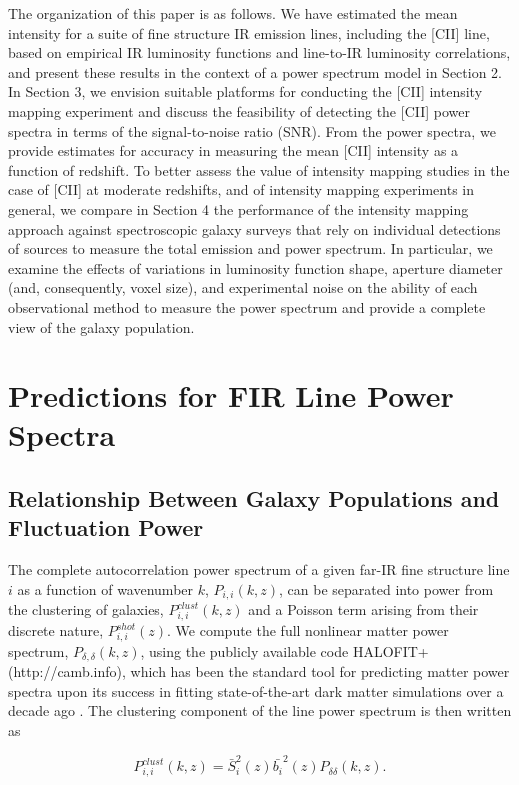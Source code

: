 \documentclass[iop,twocolappendix]{emulateapj}
\begin{document}
The organization of this paper is as follows. We have estimated the mean intensity for a suite of fine structure IR emission lines, including the [CII] line, based on empirical IR luminosity functions and line-to-IR luminosity correlations, and present these results in the context of a power spectrum model in Section 2. In Section 3, we envision suitable platforms for conducting the [CII] intensity mapping experiment and discuss the feasibility of detecting the [CII] power spectra in terms of the signal-to-noise ratio (SNR). From the power spectra, we provide estimates for accuracy in measuring the mean [CII] intensity as a function of redshift. To better assess the value of intensity mapping studies in the case of [CII] at moderate redshifts, and of intensity mapping experiments in general, we compare in Section 4 the performance of the intensity mapping approach against spectroscopic galaxy surveys that rely on individual detections of sources to measure the total emission and power spectrum. In particular, we examine the effects of variations in luminosity function shape, aperture diameter (and, consequently, voxel size), and experimental noise on the ability of each observational method to measure the power spectrum and provide a complete view of the galaxy population. 

\section{Predictions for FIR Line Power Spectra}

\subsection{Relationship Between Galaxy Populations and Fluctuation Power}

The complete autocorrelation power spectrum of a given far-IR fine structure line $i$ as a function of wavenumber $k$, $P_{i,i}(k,z)$, can be separated into power from the clustering of galaxies, $P_{i,i}^{clust}(k,z)$ and a Poisson term arising from their discrete nature, $P_{i,i}^{shot}(z)$. We compute the full nonlinear matter power spectrum, $P_{\delta,\delta}(k, z)$, using the publicly available code HALOFIT+ (http://camb.info), which has been the standard tool for predicting matter power spectra upon its success in fitting state-of-the-art dark matter simulations over a decade ago \citep{halofit}.  The clustering component of the line power spectrum is then written as

\begin{equation}
 P_{i,i}^{clust}(k, z) = \bar{S}_{i}^2(z) \bar{b_i}^2(z) P_{\delta\delta}(k, z).
 \label{eq:pclust}
 \end{equation}
\end{document}
